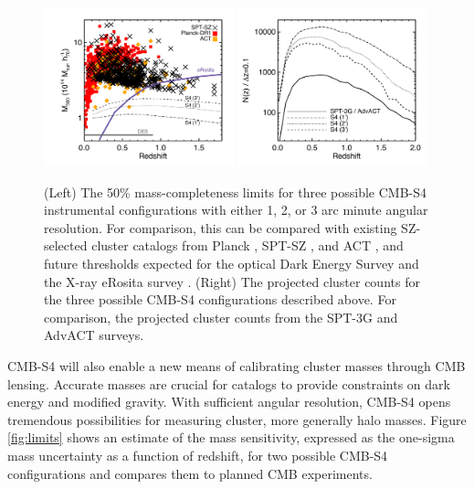 \begin{figure}[t]
\begin{center}
\includegraphics[width=0.49\textwidth]{DarkEnergy/mass_vs_z_s4.pdf}
\includegraphics[width=0.49\textwidth]{DarkEnergy/dndz_s4.pdf}
\caption{(Left) The 50\% mass-completeness limits for three possible CMB-S4 instrumental configurations with either 1, 2, or 3 arc minute angular resolution.  For comparison, this can be compared with existing SZ-selected cluster catalogs from Planck \cite{planck15-32}, SPT-SZ \cite{bleem15b}, and ACT \cite{hasselfield13}, and future thresholds expected for the optical Dark Energy Survey and the X-ray eRosita survey \cite{pillepich12}.  (Right) The projected cluster counts for the three possible CMB-S4 configurations described above.  For comparison, the projected cluster counts from the SPT-3G \cite{benson14} and AdvACT surveys.}
\label{fig:cluster_counts}
\end{center}
\end{figure} 

CMB-S4 will also enable a new means of calibrating cluster masses through CMB lensing.
Accurate masses are crucial for catalogs to provide constraints on dark energy and modified gravity.
With sufficient angular resolution, CMB-S4 opens tremendous possibilities for measuring cluster, more generally halo masses.    
  Figure \ref{fig:limits} shows an estimate of the mass sensitivity, expressed as the one-sigma mass uncertainty as a function of redshift, for two possible CMB-S4 configurations and compares them to planned CMB experiments. 


